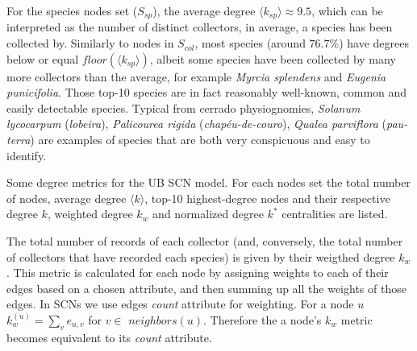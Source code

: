 For the species nodes set ($S_{sp}$), the average degree $\langle k_{sp}\rangle \approx 9.5$, which can be interpreted as the number of distinct collectors, in average, a species has been collected by. Similarly to nodes in $S_{col}$, most species (around $76.7\%$) have degrees below or equal $floor(\langle k_{sp}\rangle)$, albeit some species have been collected by many more collectors than the average, for example \textit{Myrcia splendens} and \textit{Eugenia punicifolia}. Those top-10 species are in fact reasonably well-known, common and easily detectable species. Typical from cerrado physiognomies, \textit{Solanum lycocarpum} (\textit{lobeira}), \textit{Palicourea rigida} (\textit{chapéu-de-couro}), \textit{Qualea parviflora} (\textit{pau-terra}) are examples of species that are both very conspicuous and easy to identify.


\begin{table}[t]
\caption{ Some degree metrics for the UB SCN model. For each nodes set the total number of nodes, average degree $\langle k \rangle$, top-10 highest-degree nodes and their respective degree $k$, weighted degree $k_w$ and normalized degree $k^*$ centralities are listed.}
\begin{center}
	
\end{center}
\label{table:ub_scn_degrees}
\end{table}

The total number of records of each collector (and, conversely, the total number of collectors that have recorded each species) is given by their weigthed degree $k_w$.
This metric is calculated for each node by assigning weights to each of their edges based on a chosen attribute, and then summing up all the weights of those edges.
In SCNs we use edges \textit{count} attribute for weighting. 
For a node $u$
$ k_w^{(u)} = \sum_{v} e_{u,v}$ for $v \in$ $neighbors(u)$.
Therefore the a node's $k_w$ metric becomes equivalent to its \textit{count} attribute.


